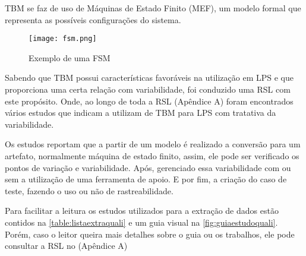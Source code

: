 TBM se faz de uso de Máquinas de Estado Finito (MEF), um modelo formal que representa as possíveis configurações do sistema.

\begin{figure}[htb]
	\centering
	\texttt{[image: fsm.png]}
	\caption{ Exemplo de uma FSM \citealp{costa2016split}}
	\label{fig:testetbm}
\end{figure}


Sabendo que TBM possui características favoráveis na utilização em LPS e que proporciona uma certa relação com variabilidade, foi conduzido uma RSL com este propósito. Onde, ao longo de toda a RSL (Apêndice A) foram encontrados vários estudos que indicam a utilizam de TBM para LPS com tratativa da variabilidade.

Os estudos reportam que a partir de um modelo é realizado a conversão para um artefato, normalmente máquina de estado finito, assim, ele pode ser verificado os pontos de variação e variabilidade. Após, gerenciado essa variabilidade com ou sem a utilização de uma ferramenta de apoio. E por fim, a criação do caso de teste, fazendo o uso ou não de rastreabilidade.

Para facilitar a leitura os estudos utilizados para a extração de dados estão contidos na \ref{table:listaextraquali} e um guia visual na \ref{fig:guiaestudoquali}. Porém, caso o leitor queira mais detalhes sobre o guia ou os trabalhos, ele pode consultar a RSL no (Apêndice A)


